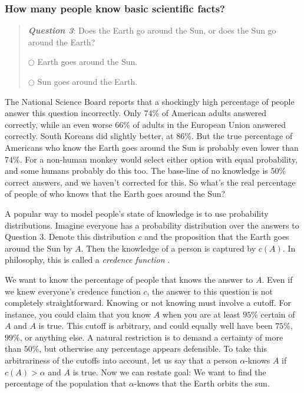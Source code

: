 \subsubsection{How many people know basic scientific facts?}
\begin{quote}
\textbf{\emph{Question 3}}: Does the Earth go around the Sun, or does
the Sun go around the Earth?

\medskip

$\bigcirc$ Earth goes around the Sun.

$\bigcirc$ Sun goes around the Earth.
\end{quote}
The National Science Board 
reports that a shockingly high percentage of people answer this question incorrectly. Only $74$\% of American adults answered correctly, while an even worse $66$\% of adults in the European Union answered correctly. South Koreans did slightly better, at $86$\%. But the true percentage of Americans who know the Earth goes around the Sun is probably even lower than $74$\%. For a non-human monkey would select either option with equal probability, and some humans probably do this too. The base-line of no knowledge is $50$\% correct answers, and we haven't corrected for this. So what's the real percentage of people of who knows that the Earth goes around the Sun? 

A popular way to model people's state of knowledge is to use probability distributions. Imagine everyone has a probability distribution over the answers to Question 3. Denote this distribution $c$ and the proposition that the Earth goes around the Sun by $A$. Then the knowledge of a person is captured by $c(A)$. In philosophy, this is called a \emph{credence function} \parencite{Pettigrew2019-rk}.

We want to know the percentage of people that knows the answer to $A$. Even if we knew everyone's credence function $c$, the answer to this question is not completely straightforward. Knowing or not knowing must involve a cutoff. For instance, you could claim that you know $A$ when you are at least $95\%$ certain of $A$ and $A$ is true. This cutoff is arbitrary, and could equally well have been $75\%$, $99\%$, or anything else. A natural restriction is to demand a certainty of more than $50\%$, but otherwise any percentage appears defensible. To take this arbitrariness of the cutoffs into account, let us say that a person $\alpha$-knows $A$ if $c(A)>\alpha$ and $A$ is true. Now we can restate goal: We want to find the percentage of the population that $\alpha$-knows that the Earth orbits the sun.


